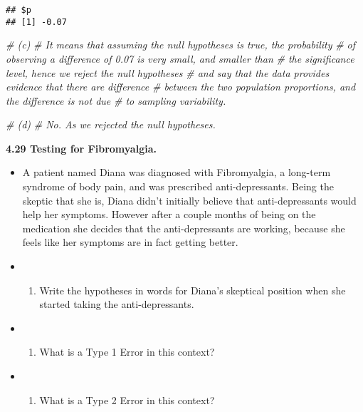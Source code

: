\documentclass[]{book}
\newenvironment{Shaded}{\begin{snugshade}}{\end{snugshade}}
\newcommand{\CommentTok}[1]{\textcolor[rgb]{0.56,0.35,0.01}{\textit{#1}}}
\providecommand{\tightlist}{%
  \setlength{\itemsep}{0pt}\setlength{\parskip}{0pt}}
\begin{document}
\begin{verbatim}
## $p
## [1] -0.07
\end{verbatim}

\begin{Shaded}
\begin{Highlighting}[]
\CommentTok{# (c) }
\CommentTok{# It means that assuming the null hypotheses is true, the probability}
\CommentTok{# of observing a difference of 0.07 is very small, and smaller than}
\CommentTok{# the significance level, hence we reject the null hypotheses }
\CommentTok{# and say that the data provides evidence that there are difference }
\CommentTok{# between the two population proportions, and the difference is not due}
\CommentTok{# to sampling variability.}
\end{Highlighting}
\end{Shaded}

\begin{Shaded}
\begin{Highlighting}[]
\CommentTok{# (d)}
\CommentTok{# No. As we rejected the null hypotheses.}
\end{Highlighting}
\end{Shaded}

\textbf{4.29 Testing for Fibromyalgia.}

\begin{itemize}
\item
  A patient named Diana was diagnosed with Fibromyalgia, a
  long-term syndrome of body pain, and was prescribed anti-depressants. Being the skeptic that she
  is, Diana didn't initially believe that anti-depressants would help her symptoms. However after
  a couple months of being on the medication she decides that the anti-depressants are working,
  because she feels like her symptoms are in fact getting better.
\item
  \begin{enumerate}
  \def\labelenumi{(\alph{enumi})}
  \tightlist
  \item
    Write the hypotheses in words for Diana's skeptical position when she started taking the
    anti-depressants.
  \end{enumerate}
\item
  \begin{enumerate}
  \def\labelenumi{(\alph{enumi})}
  \setcounter{enumi}{1}
  \tightlist
  \item
    What is a Type 1 Error in this context?
  \end{enumerate}
\item
  \begin{enumerate}
  \def\labelenumi{(\alph{enumi})}
  \setcounter{enumi}{2}
  \tightlist
  \item
    What is a Type 2 Error in this context?
  \end{enumerate}
\end{itemize}
\end{document}

